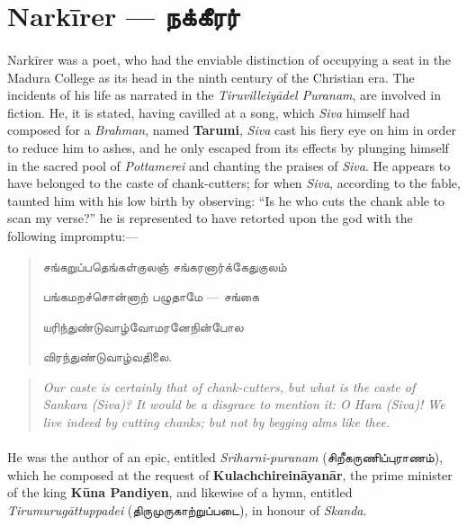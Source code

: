 \documentclass{article}
\newcommand{\TamilText}[1]{\texttamil{#1}}
\newcommand{\TamilBold}[1]{\texttamil{\textbf{#1}}}
\newcommand{\tam}[1]{\TamilText{#1}}
\newcommand{\tambold}[1]{\TamilBold{#1}}
\begin{document}
\section{Nark\={i}rer --- \tambold{நக்கீரர்}}
\paragraph{}
Nark\={i}rer was a poet, who had the enviable distinction of occupying a seat in the Madura College as its head in the ninth century of the Christian era. The incidents of his life as narrated in the \emph{Tiruvilleiy\={a}del Puranam}, are involved in fiction. He, it is stated, having cavilled at a song, which \emph{Siva} himself had composed for a \emph{Brahman}, named \textbf{Tarumi}, \emph{Siva} cast his fiery eye on him in order to reduce him to ashes, and he only escaped from its effects by plunging himself in the sacred pool of \emph{Pottamerei} and chanting the praises of \emph{Siva}. He appears to have belonged to the caste of chank-cutters; for when \emph{Siva}, according to the fable, taunted him with his low birth by observing: ``Is he who cuts the chank able to scan my verse?'' he is represented to have retorted upon the god with the following impromptu:---
\begin{quotation}\small
\tam{சங்கறுப்பதெங்கள்குலஞ்‌ சங்கரனார்க்கேதுகுலம்‌}

\tam{பங்கமறச்சொன்னாற்‌ பழுதாமே} --- \tam{சங்கை}

\tam{யரிந்துண்டுவாழ்வோமரனேநின்போல}

\tam{விரந்துண்டுவாழ்வதிலை}.
\end{quotation}
\begin{quotation}\small
\emph{Our caste is certainly that of chank-cutters, but what is the caste of Sankara (Siva)? It would be a disgrace to mention it: O Hara (Siva)! We live indeed by cutting chanks; but not by begging alms like thee.}
\end{quotation}
\paragraph{}
He was the author of an epic, entitled \emph{Sriharni-puranam} (\tam{சிறீகருணிப்புராணம்}), which he composed at the request of \textbf{Kulachchirein\={a}yan\={a}r}, the prime minister of the king \textbf{K\={u}na Pandiyen}, and likewise of a hymn, entitled \emph{Tirumurug\={a}ttuppadei} (\tam{திருமுருகாற்றுப்படை}), in honour of \emph{Skanda}.
\end{document}
